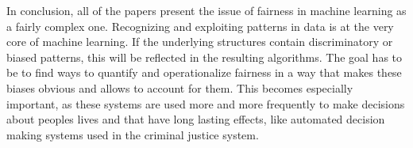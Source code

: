 In conclusion, all of the papers present the issue of fairness in machine
learning as a fairly complex one. Recognizing and exploiting patterns in 
data is at the very core of machine learning. If the underlying structures contain
discriminatory or biased patterns, this will be reflected in the resulting
algorithms. The goal has to be to find ways to quantify and operationalize
fairness in a way that makes these biases obvious and allows to account for
them. This becomes especially important, as these systems are used more
and more frequently to make decisions about peoples lives and that have long
lasting effects, like automated decision making systems used in the 
criminal justice system.